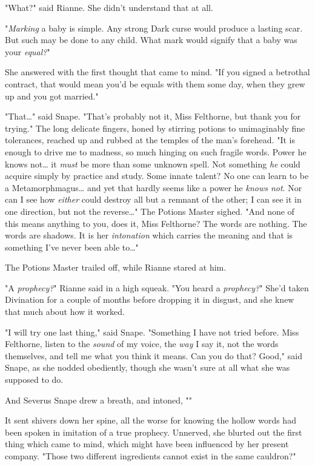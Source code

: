 "What?" said Rianne. She didn't understand that at all.

"\emph{Marking} a baby is simple. Any strong Dark curse would produce a lasting
scar. But such may be done to any child. What mark would signify that a baby
was your \emph{equal?}"

She answered with the first thought that came to mind. "If you signed a
betrothal contract, that would mean you'd be equals with them some day, when
they grew up and you got married."

"That{\ldots}" said Snape. "That's probably not it, Miss Felthorne, but thank
you for trying." The long delicate fingers, honed by stirring potions to
unimaginably fine tolerances, reached up and rubbed at the temples of the man's
forehead. "It is enough to drive me to madness, so much hinging on such fragile
words. Power he knows not{\ldots} it \emph{must} be more than some unknown
spell. Not something \emph{he} could acquire simply by practice and study. Some
innate talent? No one can learn to be a Metamorphmagus{\ldots} and yet that
hardly seems like a power he \emph{knows not}. Nor can I see how \emph{either}
could destroy all but a remnant of the other; I can see it in one direction,
but not the reverse{\ldots}" The Potions Master sighed. "And none of this means
anything to you, does it, Miss Felthorne? The words are nothing. The words are
shadows. It is her \emph{intonation} which carries the meaning and that is
something I've never been able to{\ldots}"

The Potions Master trailed off, while Rianne stared at him.

"A \emph{prophecy?}" Rianne said in a high squeak. "You heard a
\emph{prophecy?}" She'd taken Divination for a couple of months before dropping
it in disgust, and she knew that much about how it worked.

"I will try one last thing," said Snape. "Something I have not tried before.
Miss Felthorne, listen to the \emph{sound} of my voice, the \emph{way} I say
it, not the words themselves, and tell me what you think it means. Can
you do that? Good," said Snape, as she nodded obediently, though she wasn't
sure at all what she was supposed to do.

And Severus Snape drew a breath, and intoned, ""

It sent shivers down her spine, all the worse for knowing the hollow words had
been spoken in imitation of a true prophecy. Unnerved, she blurted out the
first thing which came to mind, which might have been influenced by her present
company. "Those two different ingredients cannot exist in the same cauldron?"

